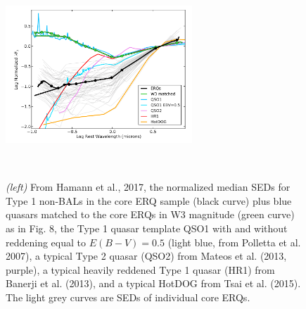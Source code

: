 \documentclass[12pt]{article}
\begin{document}
\hspace{-2.5cm}
\begin{figure}[h]
  \begin{center}
    \hspace{-0.5cm}
    \includegraphics[height=7.0cm,width=7.0cm]{../Figures/Hamann2017_Fig16_SEDs.png}
    \vspace{-10pt}
    \caption{
      \footnotesize
      {\it (left)} From Hamann et al., 2017, the normalized median
      SEDs for Type 1 non-BALs in the core ERQ sample (black curve) plus
      blue quasars matched to the core ERQs in W3 magnitude (green curve) as
      in Fig. 8, the Type 1 quasar template QSO1 with and without reddening
      equal to $E(B − V) = 0.5$ (light blue, from Polletta et al. 2007), a
      typical Type 2 quasar (QSO2) from Mateos et al. (2013, purple), a
      typical heavily reddened Type 1 quasar (HR1) from Banerji et
      al. (2013), and a typical HotDOG from Tsai et al. (2015). The light
      grey curves are SEDs of individual core ERQs.
    }
    \vspace{-14pt}
    \label{figtest-fig}
  \end{center}
\end{figure}









\clearpage

%
%
\describeobservations   %

\end{document}
